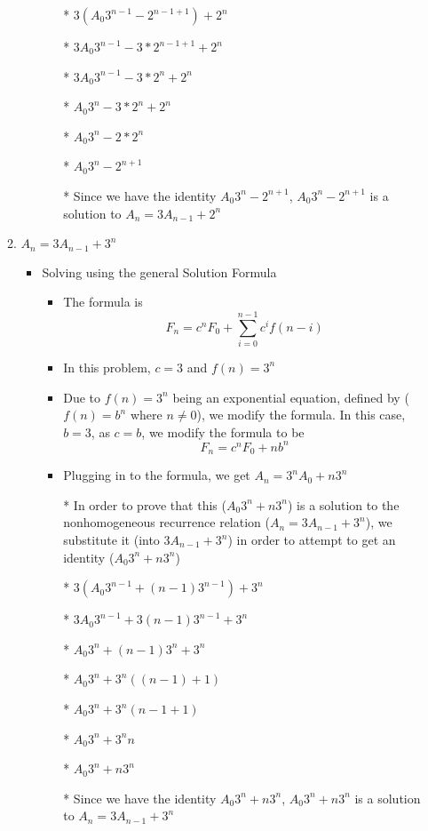 \documentclass{article}
\begin{document}
\begin{enumerate}
\begin{enumerate}
\begin{itemize}
\begin{itemize}
      \item [*] $3(A_{0}3^{n-1}-2^{n-1+1})+2^{n}$
      \item [*] $3A_{0}3^{n-1}-3*2^{n-1+1}+2^{n}$
      \item [*] $3A_{0}3^{n-1}-3*2^{n}+2^{n}$
      \item [*] $A_{0}3^{n}-3*2^{n}+2^{n}$
      \item [*] $A_{0}3^{n}-2*2^{n}$
      \item [*] $A_{0}3^{n}-2^{n+1}$
      \item [*] Since we have the identity $A_{0}3^{n}-2^{n+1}$, $A_{0}3^{n}-2^{n+1}$ is a solution to $A_{n}=3A_{n-1}+2^{n}$
      \end{itemize} %
    \end{itemize} %
  \item $A_{n}=3A_{n-1}+3^{n}$
    \begin{itemize}
    \item Solving using the general Solution Formula
      \begin{itemize} %
      \item The formula is $$F_{n}=c^{n}F_{0} + \sum\limits_{i=0}^{n-1}c^{i}f(n-i)$$
      \item In this problem, $c=3$ and $f(n)=3^{n}$
      \item Due to $f(n)=3^{n}$ being an exponential equation, defined by ($f(n)=b^{n}$ where $n\neq0$), we modify the formula. In this case, $b=3$, as $c= b$, we modify the formula to be $$F_{n}=c^{n}F_{0} + nb^{n}$$
      \item Plugging in to the formula, we get $A_{n}=3^{n}A_{0} + n3^{n}$
      \item [*] In order to prove that this ($A_{0}3^{n}+n3^{n}$) is a solution to the nonhomogeneous recurrence relation ($A_{n}=3A_{n-1}+3^{n}$), we substitute it (into $3A_{n-1}+3^{n}$) in order to attempt to get an identity ($A_{0}3^{n}+n3^{n}$)
      \item [*] $3(A_{0}3^{n-1} + (n-1)3^{n-1}) + 3^{n}$
      \item [*] $3A_{0}3^{n-1} + 3(n-1)3^{n-1} + 3^{n}$
      \item [*] $A_{0}3^{n} + (n-1)3^{n} + 3^{n}$
      \item [*] $A_{0}3^{n} + 3^{n}((n-1) + 1)$
      \item [*] $A_{0}3^{n} + 3^{n}(n-1+1)$
      \item [*] $A_{0}3^{n} + 3^{n}n$
      \item [*] $A_{0}3^{n} + n3^{n}$
      \item [*] Since we have the identity $A_{0}3^{n}+n3^{n}$, $A_{0}3^{n}+n3^{n}$ is a solution to $A_{n}=3A_{n-1}+3^{n}$

\end{itemize}
\end{itemize}
\end{enumerate}
\end{enumerate}
\end{document}
